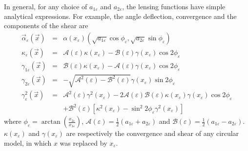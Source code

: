 \noindent In general, for any choice of $a_{1\varepsilon}$ and
$a_{2\varepsilon}$, the lensing functions have simple analytical expressions.
For example, the angle deflection, convergence and the components of the
shear are 
\begin{eqnarray}
\vec{\alpha}_\varepsilon(\vec{x})&=&\alpha(x_\varepsilon)(\sqrt{a_{1\varepsilon}
} \cos { \phi_ \varepsilon},\sqrt{a_{2\varepsilon}}\sin{\phi_\varepsilon})
\label{ang_def_pe}\\
\kappa_\varepsilon(\vec{x})&=&\mathcal{A}(\varepsilon)\kappa(x_\varepsilon)
-\mathcal{B}(\varepsilon)\gamma(x_\varepsilon)\cos{2\phi_\varepsilon}
\label{kappa_pe}\\
\gamma_{1\varepsilon}(\vec{x})& = &
\mathcal{B}(\varepsilon)\kappa(x_\varepsilon)-\mathcal{A}
(\varepsilon)\gamma(x_\varepsilon)\cos{2\phi_\varepsilon} \\
\gamma_{2\varepsilon}(\vec{x})& =
&-\sqrt{\mathcal{A}^2(\varepsilon)-\mathcal{B}^2(\varepsilon)}
\gamma(x_\varepsilon)\sin{ 2\phi_\varepsilon}\\
\gamma^2_\varepsilon(\vec{x}) & = &
\mathcal{A}^2(\varepsilon)\gamma^2(x_\varepsilon)-2\mathcal{A}
(\varepsilon)\mathcal {B}
(\varepsilon)\kappa(x_\varepsilon)\gamma(x_\varepsilon)\cos{2\phi_\varepsilon}
\nonumber  \\ &  &
+\mathcal{B}^2(\varepsilon)[\kappa^2(x_\varepsilon)-\sin^2{2\phi_\varepsilon}
\gamma^2(x_\varepsilon) ]\label{gamma_pe}
\end{eqnarray}
\noindent where
$\phi_\varepsilon=\arctan(\frac{x_{2\varepsilon}}{x_{1\varepsilon}})$,
$\mathcal{A(\varepsilon)}=\frac{1}{2}(a_{1\varepsilon}+a_{2\varepsilon})$ and
$\mathcal{B}(\varepsilon)=\frac{1}{2}(a_{1\varepsilon}-a_{2\varepsilon})$.
$\kappa(x_\varepsilon)$
and $\gamma(x_\varepsilon)$ are respectively the convergence and shear of any
circular model, in
which $x$ was replaced by $x_\varepsilon$.


